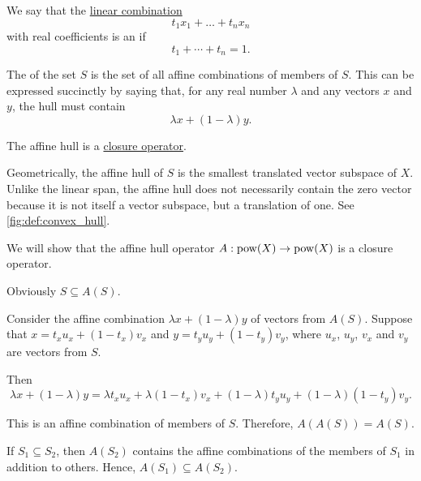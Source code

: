 \begin{definition}\label{def:affine_hull}\mimprovised
  We say that the \hyperref[rem:linear_combinations]{linear combination}
  \begin{equation*}
    t_1 x_1 + \ldots + t_n x_n
  \end{equation*}
  with real coefficients is an  if
  \begin{equation*}
    t_1 + \cdots + t_n = 1.
  \end{equation*}

  The  of the set \( S \) is the set of all affine combinations of members of \( S \). This can be expressed succinctly by saying that, for any real number \( \lambda \) and any vectors \( x \) and \( y \), the hull must contain
  \begin{equation}\label{eq:def:affine_hull/combination}
    \lambda x + (1 - \lambda) y.
  \end{equation}

  The affine hull is a \hyperref[def:closure_operator]{closure operator}.

  Geometrically, the affine hull of \( S \) is the smallest translated vector subspace of \( X \). Unlike the linear span, the affine hull does not necessarily contain the zero vector because it is not itself a vector subspace, but a translation of one. See \cref{fig:def:convex_hull}.
\end{definition}
\begin{defproof}
  We will show that the affine hull operator \( A: \operatorname{pow}(X) \to \operatorname{pow}(X) \) is a closure operator.

   Obviously \( S \subseteq A(S) \).

   Consider the affine combination \( \lambda x + (1 - \lambda) y \) of vectors from \( A(S) \). Suppose that \( x = t_x u_x + (1 - t_x) v_x \) and \( y = t_y u_y + (1 - t_y) v_y \), where \( u_x \), \( u_y \), \( v_x \) and \( v_y \) are vectors from \( S \).

  Then
  \begin{equation*}
    \lambda x + (1 - \lambda) y
    =
    \lambda t_x u_x + \lambda (1 - t_x) v_x + (1 - \lambda) t_y u_y + (1 - \lambda) (1 - t_y) v_y.
  \end{equation*}

  This is an affine combination of members of \( S \). Therefore, \( A(A(S)) = A(S) \).

   If \( S_1 \subseteq S_2 \), then \( A(S_2) \) contains the affine combinations of the members of \( S_1 \) in addition to others. Hence, \( A(S_1) \subseteq A(S_2) \).
\end{defproof}

